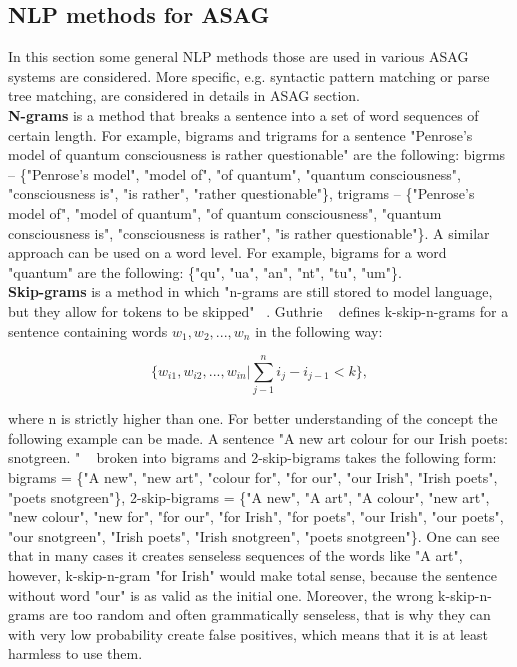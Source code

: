 \subsection{NLP methods for ASAG}

In this section some general NLP methods those are used in various ASAG systems are considered. More specific, e.g. syntactic pattern matching or parse tree matching, are considered in details in ASAG section.\\

\textbf{N-grams} is a method that breaks a sentence into a set of word sequences of certain length. For example, bigrams and trigrams for a sentence "Penrose's model of quantum consciousness is rather questionable" are the following: bigrms -- \{"Penrose's model", "model of", "of quantum", "quantum consciousness", "consciousness is", "is rather", "rather questionable"\}, trigrams -- \{"Penrose's model of", "model of quantum", "of quantum consciousness", "quantum consciousness is", "consciousness is rather", "is rather questionable"\}. A similar approach can be used on a word level. For example, bigrams for a word "quantum" are the following: \{"qu", "ua", "an", "nt", "tu", "um"\}.\\

\textbf{Skip-grams} is a method in which "n-grams are still stored to model language, but they allow for tokens to be skipped" ~\cite{Skip-gram}. Guthrie  ~\cite{Skip-gram} defines k-skip-n-grams for a sentence containing words $w_1,w_2,...,w_n$ in the following way:

\begin{equation} \label{eq:kskip}
\{w_{i1},w_{i2},...,w_{in} | \sum_{j-1}^n i_j - i_{j-1} < k\}, 
\end{equation}

where n is strictly higher than one. For better understanding of the concept the following example can be made. A sentence "A new art colour for our Irish poets: snotgreen. " ~\cite{Ulysses} broken into bigrams and 2-skip-bigrams takes the following form: bigrams = \{"A new", "new art", "colour for", "for our", "our Irish", "Irish poets", "poets snotgreen"\}, 2-skip-bigrams = \{"A new", "A art", "A colour", "new art", "new colour", "new for", "for our", "for Irish", "for poets", "our Irish", "our poets", "our snotgreen", "Irish poets", "Irish snotgreen",  "poets snotgreen"\}. One can see that in many cases it creates senseless sequences of the words like "A art", however, k-skip-n-gram "for Irish" would make total sense, because the sentence without word "our" is as valid as the initial one. Moreover, the wrong k-skip-n-grams are too random and often grammatically senseless, that is why they can with very low probability create false positives, which means that it is at least harmless to use them.\\

